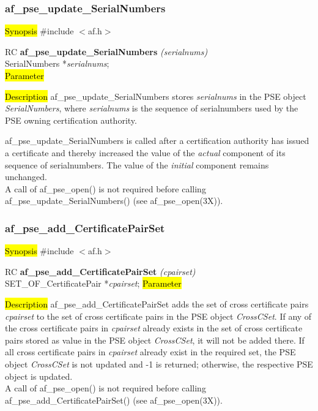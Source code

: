 \subsubsection{af\_pse\_update\_SerialNumbers}
\label{af_update_SerialNumbers}
\hl{Synopsis}
\#include $<$af.h$>$

RC {\bf af\_pse\_update\_SerialNumbers} {\em (serialnums)} \\
SerialNumbers *{\em serialnums}; \\
\hl{Parameter}

\hl{Description}
af\_pse\_update\_SerialNumbers stores {\em serialnums} in the PSE object {\em SerialNumbers},
where {\em serialnums} is the sequence of serialnumbers used by the PSE owning certification
authority. 

af\_pse\_update\_SerialNumbers is called after a certification authority has issued a
certificate and thereby increased the value of the {\em actual} component of its sequence of
serialnumbers. The value of the {\em initial} component remains unchanged.
\\ [1em]
A call of af\_pse\_open() is not required before calling af\_pse\_update\_SerialNumbers()
(see af\_pse\_open(3X)).


\subsubsection{af\_pse\_add\_CertificatePairSet}
\label{af_add_CertificatePairSet}
\hl{Synopsis}
\#include $<$af.h$>$

RC {\bf af\_pse\_add\_CertificatePairSet} {\em (cpairset)} \\
SET\_OF\_CertificatePair *{\em cpairset};
\hl{Parameter}

\hl{Description}
af\_pse\_add\_CertificatePairSet adds the set of cross certificate pairs {\em cpairset}
to the set of cross certificate pairs in the PSE object {\em CrossCSet}. 
If any of the cross certificate pairs in {\em cpairset} already exists in the set of cross
certificate pairs stored as value in the PSE object {\em CrossCSet}, it will not be added there.
If all cross certificate pairs in {\em cpairset} already exist in the required set,
the PSE object {\em CrossCSet} is not updated and -1 is returned; otherwise, the respective 
PSE object is updated. 
\\ [1em]
A call of af\_pse\_open() is not required before calling af\_pse\_add\_CertificatePairSet()
(see af\_pse\_open(3X)).

